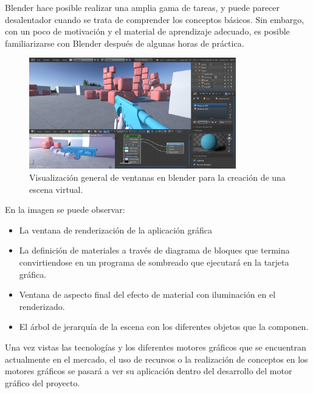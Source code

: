 \documentclass[a4paper]{book}
\begin{document}
Blender hace posible realizar una amplia gama de tareas, y puede parecer desalentador cuando se trata de comprender los
conceptos básicos. Sin embargo, con un poco de motivación y el material de aprendizaje adecuado, es posible familiarizarse
con Blender después de algunas horas de práctica.

\begin{figure}[H]
    \centering
    \includegraphics[width=9cm, keepaspectratio]{img/Blender.jpg}
    \caption{Visualización general de ventanas en blender para la creación de una escena virtual.}
    \label{Blender}
\end{figure}

En la imagen se puede observar:

\begin{itemize}
  \item La ventana de renderización de la aplicación gráfica

  \item La definición de materiales a través de diagrama de bloques que termina
  convirtiendose en un programa de sombreado que ejecutará en la tarjeta gráfica.

  \item Ventana de aspecto final del efecto de material con iluminación en el renderizado.

  \item El árbol de jerarquía de la escena con los diferentes objetos que la componen.

\end{itemize}

Una vez vistas las tecnologías y los diferentes motores gráficos que se encuentran actualmente en el mercado,
el uso de recursos o la realización de conceptos en los motores gráficos se pasará a ver su aplicación dentro
del desarrollo del motor gráfico del proyecto.


\end{document}
